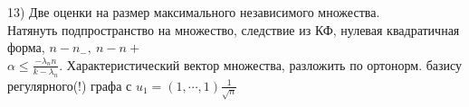 13) Две оценки на размер максимального независимого множества.\\    
Натянуть подпространство на  множество, следствие из КФ, нулевая квадратичная форма, $n- n_{-},\: n-n{+}$\\
$\alpha \le \frac{-\lambda_n n}{k - \lambda_n}$. Характеристический вектор множества, разложить по ортонорм. базису регулярного(!) графа с $u_1 = (1,\cdots,1) \frac{1}{\sqrt n}$\\
